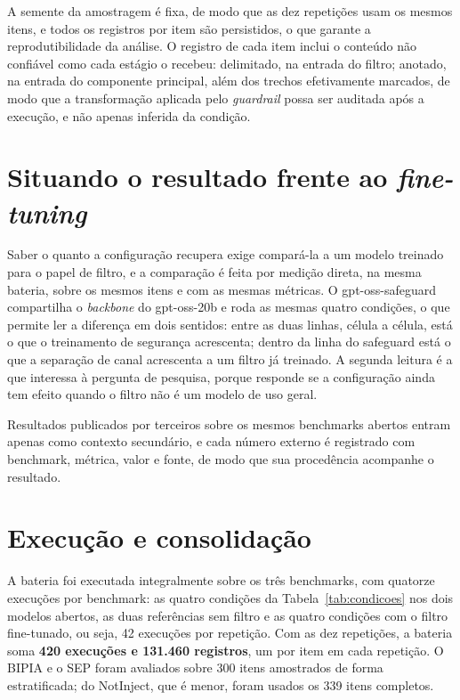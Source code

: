 A semente da amostragem é fixa, de modo que as dez repetições usam os mesmos
itens, e todos os registros por item são persistidos, o que garante a
reprodutibilidade da análise. O registro de cada item inclui o conteúdo não
confiável como cada estágio o recebeu: delimitado, na entrada do
filtro; anotado, na entrada do componente principal, além dos trechos
efetivamente marcados, de modo que a transformação aplicada pelo
\textit{guardrail} possa ser auditada após a execução, e não apenas inferida da
condição.

\section{Situando o resultado frente ao \textit{fine-tuning}}\label{sec:ancora}

Saber o quanto a configuração recupera exige compará-la a um modelo treinado
para o papel de filtro, e a comparação é feita por medição direta, na mesma
bateria, sobre os mesmos itens e com as mesmas métricas. O gpt-oss-safeguard
compartilha o \textit{backbone} do gpt-oss-20b e roda as mesmas quatro
condições, o que permite ler a diferença em dois sentidos: entre as duas
linhas, célula a célula, está o que o treinamento de segurança acrescenta;
dentro da linha do safeguard está o que a separação de canal acrescenta a um
filtro já treinado. A segunda leitura é a que interessa à pergunta de
pesquisa, porque responde se a configuração ainda tem efeito quando o filtro
não é um modelo de uso geral.

Resultados publicados por terceiros sobre os mesmos benchmarks abertos
\cite{chen2025metasecalign, wang2025datafilter} entram apenas como contexto
secundário, e cada número externo é registrado com benchmark, métrica, valor e
fonte, de modo que sua procedência acompanhe o resultado.

\section{Execução e consolidação}\label{sec:analise}

A bateria foi executada integralmente sobre os três benchmarks, com quatorze
execuções por benchmark: as quatro condições da Tabela~\ref{tab:condicoes} nos
dois modelos abertos, as duas referências sem filtro e as quatro condições com
o filtro fine-tunado, ou seja, 42 execuções por repetição. Com as dez
repetições, a bateria soma \textbf{420 execuções e 131.460 registros}, um por
item em cada repetição. O BIPIA e o SEP foram avaliados sobre 300 itens
amostrados de forma estratificada; do NotInject, que é menor, foram usados os
339 itens completos.

